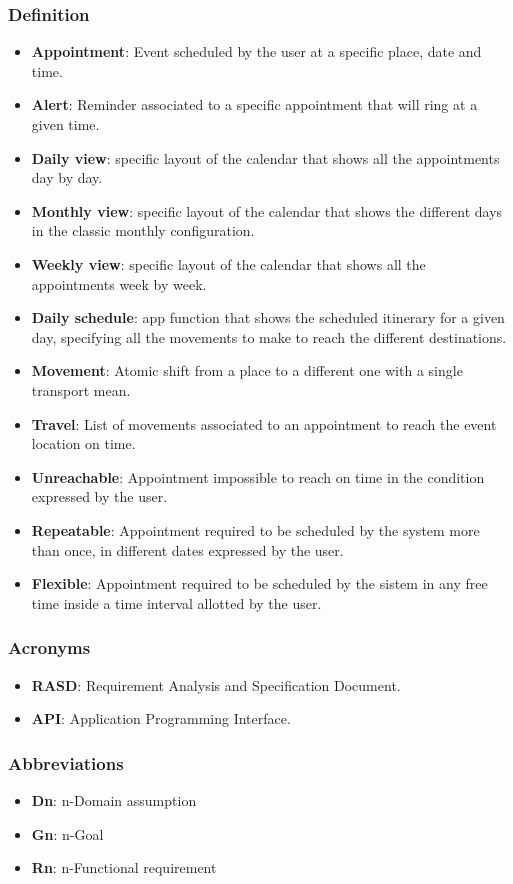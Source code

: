 \subsubsection{Definition}
\begin{itemize}
	\item \textbf{Appointment}: Event scheduled by the user at a specific place, date and time.
	\item \textbf{Alert}: Reminder associated to a specific appointment that will ring at a given time.
	\item \textbf{Daily view}:   specific layout of the calendar that shows all the appointments day by day. 
	\item \textbf{Monthly view}: specific layout of the calendar that shows the different days in the classic monthly configuration.
	\item \textbf{Weekly view}: specific layout of the calendar that shows all the appointments week by week. 
	\item \textbf{Daily schedule}: app function that shows the scheduled itinerary for a given day, specifying all the movements to make to reach the different destinations.
	\item \textbf{Movement}: Atomic shift from a place to a different one with a single transport mean.
	\item \textbf{Travel}: List of movements associated to an appointment to reach the event location on time.
	\item \textbf{Unreachable}: Appointment impossible to reach on time in the condition expressed by the user.
	\item \textbf{Repeatable}: Appointment required to be scheduled by the system more than once, in different dates expressed by the user.
	\item \textbf{Flexible}: Appointment required to be scheduled by the sistem in any free time inside a time interval allotted by the user.
\end{itemize}
\subsubsection{Acronyms}
\begin{itemize}
	\item \textbf{RASD}: Requirement Analysis and Specification Document.
	\item \textbf{API}: Application Programming Interface.
\end{itemize}
\subsubsection{Abbreviations}
\begin{itemize}
	\item \textbf{Dn}: n-Domain assumption
	\item \textbf{Gn}: n-Goal
	\item \textbf{Rn}: n-Functional requirement
\end{itemize}
